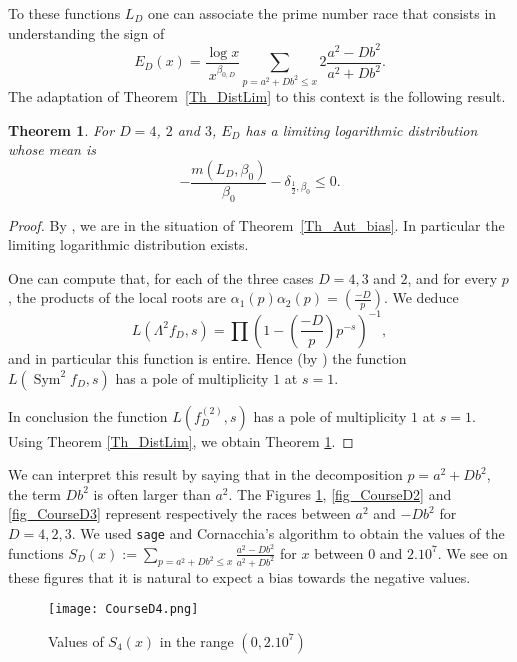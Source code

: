 \documentclass[a4paper,10pt]{amsart}
\theoremstyle{plain}
\newtheorem{theo}{Theorem}[section]
\theoremstyle{definition}
\begin{document}
To these functions $L_{D}$ one can associate the prime number race that consists in understanding the sign of
$$E_{D}(x) = \frac{\log x}{x^{\beta_{0,D}}}\sum_{p=a^{2} + Db^{2}\leq x}2\frac{a^{2} - Db^{2}}{a^{2} + Db^{2}}.$$
The adaptation of Theorem~\ref{Th_DistLim} to this context is the following result.

\begin{theo}\label{Th_sum2squares}
	For $D= 4$, $2$ and $3$,
	$E_{D}$ has a limiting logarithmic distribution whose mean is 
	$$-\frac{m(L_{D},\beta_{0})}{\beta_{0}} -\delta_{\frac{1}{2},\beta_{0}}\leq 0.$$
\end{theo}

\begin{proof}
By \cite[Th. 14.2]{BS}, we are in the situation of Theorem~\ref{Th_Aut_bias}.
In particular the limiting logarithmic distribution exists. 

One can compute that, for each of the three cases $D=4,3$ and $2$, and for every $p$,
the products of the local roots are
$\alpha_{1}(p)\alpha_{2}(p) = \left(\frac{-D}{p}\right)$.
We deduce  
$$L\left(\Lambda^{2}f_{D},s\right)=\prod\left(1-\left(\frac{-D}{p}\right)p^{-s}\right)^{-1},$$ 
and in particular this function is entire.
Hence (by \cite[App.]{MW}) the function $L(\operatorname{Sym}^{2}f_{D},s)$ has a pole of multiplicity $1$ at $s=1$.

In conclusion the function $L(f_{D}^{(2)},s)$ has a pole of multiplicity $1$ at $s=1$. 
Using Theorem \ref{Th_DistLim}, we obtain Theorem \ref{Th_sum2squares}.
\end{proof}

We can interpret this result by saying that in the decomposition $p=a^{2} + Db^{2}$, the term $Db^{2}$ is often larger than $a^2$.
The Figures \ref{fig_CourseD4}, \ref{fig_CourseD2} and \ref{fig_CourseD3} represent respectively the races between $a^{2}$ and $-Db^{2}$ for $D=4,2,3$. We used \texttt{sage} and Cornacchia's algorithm to obtain the values of the functions $S_{D}(x):=\sum_{p=a^{2} + Db^{2}\leq x}\frac{a^{2} - Db^{2}}{a^{2} + Db^{2}}$ for $x$ between $0$ and $2.10^{7}$.
We see on these figures that it is natural to expect a bias towards the negative values.

\begin{figure}
	\centering
	\texttt{[image: CourseD4.png]}
	
	\caption{Values of $S_{4}(x)$ in the range $(0,2.10^{7})$}
	\label{fig_CourseD4}
\end{figure}
\end{document}

